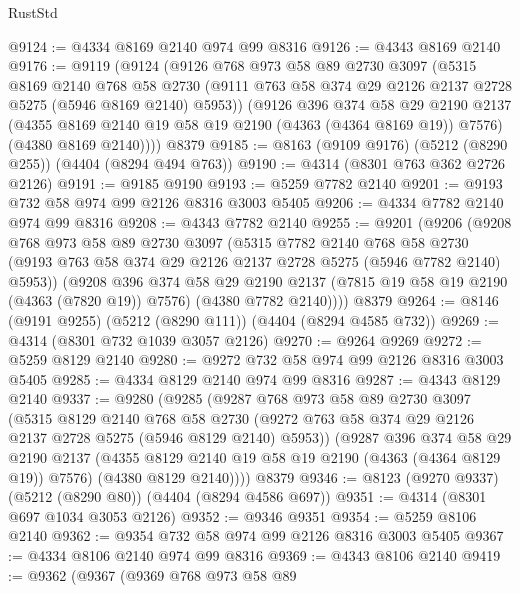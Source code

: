 \begin{lexlean}{RustStd}
\begin{coremodule}
@9124 := @4334 @8169 @2140 @974 @99 @8316
@9126 := @4343 @8169 @2140
@9176 := @9119
    (@9124
      (@9126
        @768
        @973
        @58
        @89
        @2730
        @3097
        (@5315
          @8169
          @2140
          @768
          @58
          @2730
          (@9111 @763 @58 @374 @29 @2126 @2137 @2728 @5275 (@5946 @8169 @2140) @5953))
        (@9126
          @396
          @374
          @58
          @29
          @2190
          @2137
          (@4355 @8169 @2140 @19 @58 @19 @2190 (@4363 (@4364 @8169 @19)) @7576)
          (@4380 @8169 @2140))))
    @8379
@9185 := @8163 (@9109 @9176) (@5212 (@8290 @255)) (@4404 (@8294 @494 @763))
@9190 := @4314 (@8301 @763 @362 @2726 @2126)
@9191 := @9185 @9190
@9193 := @5259 @7782 @2140
@9201 := @9193 @732 @58 @974 @99 @2126 @8316 @3003 @5405
@9206 := @4334 @7782 @2140 @974 @99 @8316
@9208 := @4343 @7782 @2140
@9255 := @9201
    (@9206
      (@9208
        @768
        @973
        @58
        @89
        @2730
        @3097
        (@5315
          @7782
          @2140
          @768
          @58
          @2730
          (@9193 @763 @58 @374 @29 @2126 @2137 @2728 @5275 (@5946 @7782 @2140) @5953))
        (@9208
          @396
          @374
          @58
          @29
          @2190
          @2137
          (@7815 @19 @58 @19 @2190 (@4363 (@7820 @19)) @7576)
          (@4380 @7782 @2140))))
    @8379
@9264 := @8146 (@9191 @9255) (@5212 (@8290 @111)) (@4404 (@8294 @4585 @732))
@9269 := @4314 (@8301 @732 @1039 @3057 @2126)
@9270 := @9264 @9269
@9272 := @5259 @8129 @2140
@9280 := @9272 @732 @58 @974 @99 @2126 @8316 @3003 @5405
@9285 := @4334 @8129 @2140 @974 @99 @8316
@9287 := @4343 @8129 @2140
@9337 := @9280
    (@9285
      (@9287
        @768
        @973
        @58
        @89
        @2730
        @3097
        (@5315
          @8129
          @2140
          @768
          @58
          @2730
          (@9272 @763 @58 @374 @29 @2126 @2137 @2728 @5275 (@5946 @8129 @2140) @5953))
        (@9287
          @396
          @374
          @58
          @29
          @2190
          @2137
          (@4355 @8129 @2140 @19 @58 @19 @2190 (@4363 (@4364 @8129 @19)) @7576)
          (@4380 @8129 @2140))))
    @8379
@9346 := @8123 (@9270 @9337) (@5212 (@8290 @80)) (@4404 (@8294 @4586 @697))
@9351 := @4314 (@8301 @697 @1034 @3053 @2126)
@9352 := @9346 @9351
@9354 := @5259 @8106 @2140
@9362 := @9354 @732 @58 @974 @99 @2126 @8316 @3003 @5405
@9367 := @4334 @8106 @2140 @974 @99 @8316
@9369 := @4343 @8106 @2140
@9419 := @9362
    (@9367
      (@9369
        @768
        @973
        @58
        @89

\end{coremodule}
\end{lexlean}
